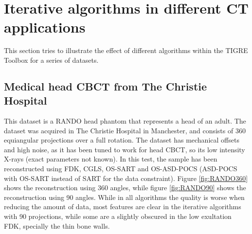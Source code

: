 \FloatBarrier
\section{Iterative algorithms in different CT applications}
This section tries to illustrate the effect of different algorithms within the TIGRE Toolbox for a series of datasets. 
\subsection{Medical head CBCT from  The Christie Hospital}

This dataset is a RANDO head phantom that represents a head of an adult. The dataset was acquired in The Christie Hospital in Manchester, and consists of 360 equiangular projections over a full rotation. The dataset has mechanical offsets and high noise, as it has been tuned to work for head CBCT, so its low intensity X-rays (exact parameters not known). In this test, the sample has been reconstructed using FDK, CGLS, OS-SART and OS-ASD-POCS (ASD-POCS with OS-SART instead of SART for the data constraint). Figure \ref{fig:RANDO360} shows the reconstruction using 360 angles, while figure \ref{fig:RANDO90} shows the reconstruction using 90 angles. While in all algorithms the quality is worse when reducing the amount of data, most features are clear in the iterative algorithms with 90 projections, while some are a slightly obscured in the low exultation FDK, specially the thin bone walls.

